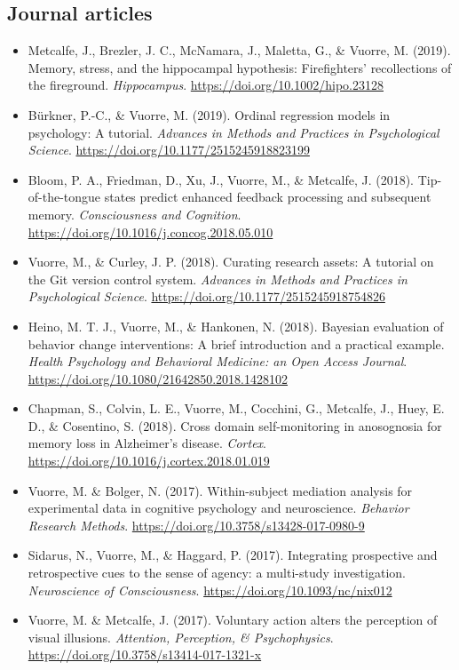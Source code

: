 \documentclass[12pt, a4paper]{article}
\newcommand{\years}[1]{\marginnote{\scriptsize #1}}
\begin{document}
\subsection*{Journal articles}
\begin{itemize}
\item \years{2019} Metcalfe, J., Brezler, J. C., McNamara, J., Maletta, G., \& Vuorre, M. (2019). Memory, stress, and the hippocampal hypothesis: Firefighters' recollections of the fireground. \emph{Hippocampus}. \url{https://doi.org/10.1002/hipo.23128}
\item Bürkner, P.-C., \& Vuorre, M. (2019). Ordinal regression models in psychology: A tutorial. \emph{Advances in Methods and Practices in Psychological Science}. \url{https://doi.org/10.1177/2515245918823199}
\item \years{2018} Bloom, P. A., Friedman, D., Xu, J., Vuorre, M., \& Metcalfe, J. (2018). Tip-of-the-tongue states predict enhanced feedback processing and subsequent memory. \emph{Consciousness and Cognition}. \url{https://doi.org/10.1016/j.concog.2018.05.010}
\item Vuorre, M., \& Curley, J. P. (2018). Curating research assets: A tutorial on the Git version control system. \emph{Advances in Methods and Practices in Psychological Science}. \url{https://doi.org/10.1177/2515245918754826}
\item Heino, M. T. J.\footnotemark[1], Vuorre, M.\footnotemark[1], \& Hankonen, N. (2018). Bayesian evaluation of behavior change interventions: A brief introduction and a practical example. \emph{Health Psychology and Behavioral Medicine: an Open Access Journal}. \url{https://doi.org/10.1080/21642850.2018.1428102}
\item Chapman, S., Colvin, L. E., Vuorre, M., Cocchini, G., Metcalfe, J., Huey, E. D., \& Cosentino, S. (2018). Cross domain self-monitoring in anosognosia for memory loss in Alzheimer's disease. \emph{Cortex}. \url{https://doi.org/10.1016/j.cortex.2018.01.019}
\item \years{2017} Vuorre, M. \& Bolger, N. (2017). Within-subject mediation analysis for experimental data in cognitive psychology and neuroscience. \emph{Behavior Research Methods}. \url{https://doi.org/10.3758/s13428-017-0980-9}
\item Sidarus, N., Vuorre, M., \& Haggard, P. (2017). Integrating prospective and retrospective cues to the sense of agency: a multi-study investigation. \emph{Neuroscience of Consciousness}. \url{https://doi.org/10.1093/nc/nix012}
\item Vuorre, M. \& Metcalfe, J. (2017). Voluntary action alters the perception of visual illusions. \emph{Attention, Perception, \& Psychophysics}. \url{https://doi.org/10.3758/s13414-017-1321-x}

\end{itemize}
\end{document}
